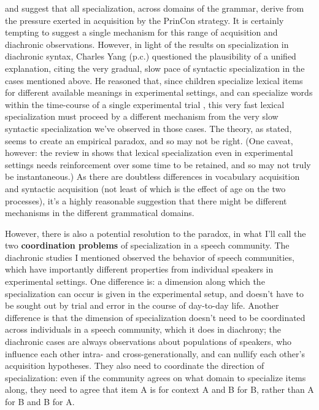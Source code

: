 \documentclass{artikel3}
\begin{document}
\citet{wallenberg2016} and \citet{fruehwaldwallenberginprep} suggest that all specialization, across domains of the grammar, derive from the pressure exerted in acquisition by the PrinCon strategy. It is certainly tempting to suggest a single mechanism for this range of acquisition and diachronic observations. However, in light of the results on specialization in diachronic syntax, Charles Yang (p.c.) questioned the plausibility of a unified explanation, citing the very gradual, slow pace of syntactic specialization in the cases mentioned above. He reasoned that, since children specialize lexical items for different available meanings in experimental settings, and can specialize words within the time-course of a single experimental trial \citep[e.g. the classic study][]{markmanwachtel1988}, this very fast lexical specialization must proceed by a different mechanism from the very slow syntactic specialization we've observed in those cases. The theory, as stated, seems to create an empirical paradox, and so may not be right. (One caveat, however: the review in \citealt{bionetal2013} shows that lexical specialization even in experimental settings needs reinforcement over some time to be retained, and so may not truly be instantaneous.) As there are doubtless differences in vocabulary acquisition and syntactic acquisition (not least of which is the effect of age on the two processes), it's a highly reasonable suggestion that there might be different mechanisms in the different grammatical domains.

However, there is also a potential resolution to the paradox, in what I'll call the two \textbf{coordination problems} of specialization in a speech community. The diachronic studies I mentioned observed the behavior of speech communities, which have importantly different properties from individual speakers in experimental settings.  One difference is: a dimension along which the specialization can occur is given in the experimental setup, and doesn't have to be sought out by trial and error in the course of day-to-day life. Another difference is that the dimension of specialization doesn't need to be coordinated across individuals in a speech community, which it does in diachrony; the diachronic cases are always observations about populations of speakers, who influence each other intra- and cross-generationally, and can nullify each other's acquisition hypotheses. They also need to coordinate the direction of specialization: even if the community agrees on what domain to specialize items along, they need to agree that item A is for context A and B for B, rather than A for B and B for A. 
\end{document}
